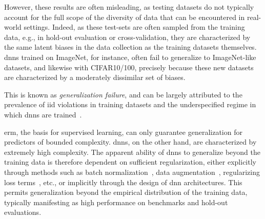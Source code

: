  However, these results are often misleading\cite{testing_ml, testing_ml2, benchmarking_validity}, as testing datasets do not typically account for the full scope of the diversity of data that can be encountered in real-world settings. Indeed, as these test-sets are often sampled from the training data, e.g., in hold-out evaluation or cross-validation, they are characterized by the same latent biases in the data collection as the training datasets themselves. \Glspl{dnn} trained on ImageNet, for instance, often fail to generalize to ImageNet-like datasets\cite{imagenet_gen}, and likewise with CIFAR10/100\cite{cifar_gen}, precisely because these new datasets are characterized by a moderately dissimilar set of biases. 


This is known as \textit{generalization failure}, and can be largely attributed to the prevalence of \gls{iid} violations in training datasets and the underspecified regime in which \glspl{dnn} are trained~\cite{damour2020underspecification, shortcut_learning}. 

\Gls{erm}, the basis for supervised learning, can only guarantee generalization for predictors of bounded complexity\cite{deep_learning_book, vapnik_statistical_learning}. \Glspl{dnn}, on the other hand, are characterized by extremely high complexity\cite{randomlabels}. The apparent ability of \Glspl{dnn} to generalize beyond the training data is therefore dependent on sufficient regularization, either explicitly through methods such as batch normalization~\cite{batchnorm}, data augmentation~\cite{generalization_datamod}, regularizing loss terms~\cite{l2_reg}, etc.\cite{regularization_survey}, or implicitly through the design of \Gls{dnn} architectures\cite{implicit_bias}. This permits generalization beyond the empirical distribution of the training data, typically manifesting as high performance on benchmarks and hold-out evaluations. 


